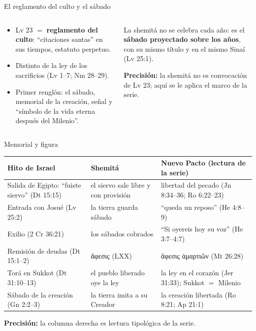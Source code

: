 \documentclass[hyperref={bookmarks=false},aspectratio=169]{beamer}
\newcommand{\grc}[1]{\foreignlanguage{ancientgreek}{#1}}
\newcommand{\destacar}[1]{\textbf{\textcolor{tierraroja}{#1}}}
\newcommand{\precision}[1]{{\footnotesize\color{sepia}\textbf{Precisión:} #1}}
\begin{document}
\begin{frame}{El reglamento del culto y el sábado}
\begin{columns}[c,onlytextwidth]
\begin{column}{0.52\textwidth}\small
\begin{itemize}
\item Lv 23 $=$ \destacar{reglamento del culto}: ``citaciones santas'' en sus tiempos, estatuto perpetuo.
\item Distinto de la ley de los sacrificios (Lv 1--7; Nm 28--29).
\item Primer renglón: el sábado, memorial de la creación, señal y ``símbolo de la vida eterna después del Milenio''.
\end{itemize}
\end{column}
\begin{column}{0.46\textwidth}
\begin{tcolorbox}[colback=papiro,colframe=tierraroja,boxrule=1pt,arc=3pt]
\small La shemitá no se celebra cada año: es el \destacar{sábado proyectado sobre los años}, con su mismo título y en el mismo Sinaí (Lv 25:1).
\end{tcolorbox}
\precision{la shemitá no es convocación de Lv 23; aquí se le aplica el marco de la serie.}
\end{column}
\end{columns}
\end{frame}

\begin{frame}{Memorial y figura}
\scriptsize\renewcommand{\arraystretch}{1.16}
\begin{tabular}{@{}L{3.3cm}L{3.3cm}L{5.4cm}@{}}
\toprule
\textbf{Hito de Israel} & \textbf{Shemitá} & \textbf{Nuevo Pacto (lectura de la serie)} \\ \midrule
Salida de Egipto: ``fuiste siervo'' (Dt 15:15) & el siervo sale libre y con provisión & libertad del pecado (Jn 8:34--36; Ro 6:22--23) \\
Entrada con Josué (Lv 25:2) & la tierra guarda sábado & ``queda un reposo'' (He 4:8--9) \\
Exilio (2 Cr 36:21) & los sábados cobrados & ``Si oyereis hoy su voz'' (He 3:7--4:7) \\
Remisión de deudas (Dt 15:1--2) & \grc{ἄφεσις} (LXX) & \grc{ἄφεσις ἁμαρτιῶν} (Mt 26:28) \\
Torá en Sukkot (Dt 31:10--13) & el pueblo liberado oye la ley & la ley en el corazón (Jer 31:33); Sukkot $=$ Milenio \\
Sábado de la creación (Gn 2:2--3) & la tierra imita a su Creador & la creación libertada (Ro 8:21; Ap 21:1) \\
\bottomrule
\end{tabular}\par\smallskip
\precision{la columna derecha es lectura tipológica de la serie.}
\end{frame}
\end{document}
